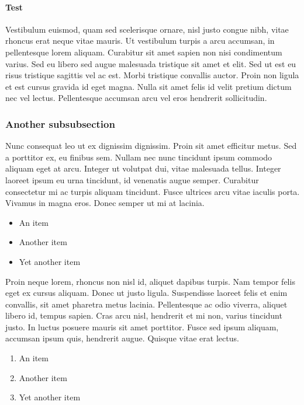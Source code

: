 \documentclass{abe}
\begin{document}
\paragraph{Test}

Vestibulum euismod, quam sed scelerisque ornare, nisl justo congue nibh, vitae rhoncus erat neque vitae mauris. Ut vestibulum turpis a arcu accumsan, in pellentesque lorem aliquam. Curabitur sit amet sapien non nisi condimentum varius. Sed eu libero sed augue malesuada tristique sit amet et elit. Sed ut est eu risus tristique sagittis vel ac est. Morbi tristique convallis auctor. Proin non ligula et est cursus gravida id eget magna. Nulla sit amet felis id velit pretium dictum nec vel lectus. Pellentesque accumsan arcu vel eros hendrerit sollicitudin. 

\subsubsection{Another subsubsection}
Nunc consequat leo ut ex dignissim dignissim. Proin sit amet efficitur metus. Sed a porttitor ex, eu finibus sem. Nullam nec nunc tincidunt ipsum commodo aliquam eget at arcu. Integer ut volutpat dui, vitae malesuada tellus. Integer laoreet ipsum eu urna tincidunt, id venenatis augue semper. Curabitur consectetur mi ac turpis aliquam tincidunt. Fusce ultrices arcu vitae iaculis porta. Vivamus in magna eros. Donec semper ut mi at lacinia.

\begin{itemize}
\item An item
\item Another item
\item Yet another item
\end{itemize}

Proin neque lorem, rhoncus non nisl id, aliquet dapibus turpis. Nam tempor felis eget ex cursus aliquam. Donec ut justo ligula. Suspendisse laoreet felis et enim convallis, sit amet pharetra metus lacinia. Pellentesque ac odio viverra, aliquet libero id, tempus sapien. Cras arcu nisl, hendrerit et mi non, varius tincidunt justo. In luctus posuere mauris sit amet porttitor. Fusce sed ipsum aliquam, accumsan ipsum quis, hendrerit augue. Quisque vitae erat lectus.

\begin{enumerate}
\item An item
\item Another item
\item Yet another item
\end{enumerate}
\end{document}
